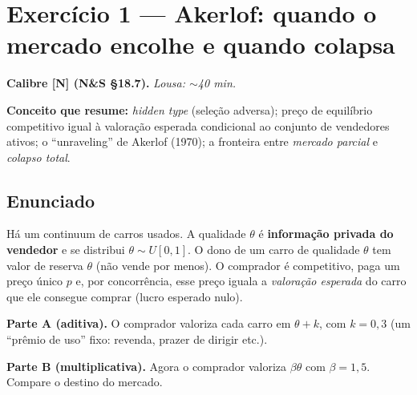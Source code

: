 \documentclass[11pt,a4paper]{article}
\newcommand{\calY}{\textbf{\textcolor{amarelo}{[N]}}} %
\newcommand{\dc}[2]{#1{,}#2}
\newif\ifsolucao
\begin{document}
\section*{\textcolor{insper}{Exercício 1 — Akerlof: quando o mercado encolhe e quando colapsa}}
\noindent\textbf{Calibre \calY{} (N\&S §18.7).} \quad \emph{Lousa: $\sim$40 min.}
\par\smallskip
\noindent\textbf{Conceito que resume:} \emph{hidden type} (seleção adversa); preço de
equilíbrio competitivo igual à valoração esperada condicional ao conjunto de
vendedores ativos; o ``unraveling'' de Akerlof (1970); a fronteira entre
\emph{mercado parcial} e \emph{colapso total}.

\subsection*{Enunciado}
Há um continuum de carros usados. A qualidade $\theta$ é \textbf{informação privada do
vendedor} e se distribui $\theta \sim U[0,1]$. O dono de um carro de qualidade $\theta$
tem valor de reserva $\theta$ (não vende por menos). O comprador é competitivo, paga um
preço único $p$ e, por concorrência, esse preço iguala a \emph{valoração esperada} do
carro que ele consegue comprar (lucro esperado nulo).

\smallskip
\noindent\textbf{Parte A (aditiva).} O comprador valoriza cada carro em $\theta + k$, com
$k = \dc{0}{3}$ (um ``prêmio de uso'' fixo: revenda, prazer de dirigir etc.).

\smallskip
\noindent\textbf{Parte B (multiplicativa).} Agora o comprador valoriza $\beta\theta$ com
$\beta = \dc{1}{5}$. Compare o destino do mercado.

\ifsolucao
\end{document}
